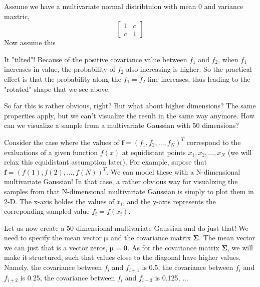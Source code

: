 Assume we have a multivariate normal distribtuion with mean 0 and variance maxtric, 
$$\begin{bmatrix}
    1&c \\ 
    c&1
\end{bmatrix}$$
Now assume this 


It "tilted"! Because of the positive covariance value between $f_1$ and $f_2$, when $f_1$ increases
in value, the probability of $f_2$ also increasing is higher. So the practical effect is that the
probability along the $f_1=f_2$ line increases, thus leading to the "rotated" shape that we see
above.

So far this is rather obvious, right? But what about higher dimensions? The same properties apply,
but we can't visualize the result in the same way anymore. How can we visualize a sample from a
multivariate Gaussian with 50 dimensions? 

Consider the case where the values of $\textbf{f} = (f_1,f_2,\dots,f_N)^T$ correspond to the
evaluations of a given function $f(x)$ at equidistant points $x_1,x_2,\dots,x_N$ (we will relax this
equidistant assumption later). For example, supose that $\textbf{f} = (f(1),f(2),\dots,f(N))^T$. We
can model these with a N-dimensional multivariate Gaussian! In that case, a rather obvious way for
visualizing the samples from that N-dimensional multivariate Gaussian is simply to plot them in 2-D.
The x-axis holdes the values of $x_i$, and the y-axis represents the correponding sampled value $f_i
= f(x_i)$. 

Let us now create a 50-dimensional multivariate Gaussian and do just that! We need to specify the
mean vector $\boldsymbol\mu$ and the covariance matrix $\boldsymbol\Sigma$. The mean vector we can
just that is a vector zeros, $\boldsymbol\mu = \textbf{0}$. As for the covariance matrix
$\boldsymbol\Sigma$, we will make it structured, such that values close to the diagonal have higher
values. Namely, the covariance between $f_i$ and $f_{i+1}$ is 0.5, the covariance between $f_i$ and
$f_{i+2}$ is 0.25, the covariance between $f_i$ and $f_{i+3}$ is 0.125, ... 